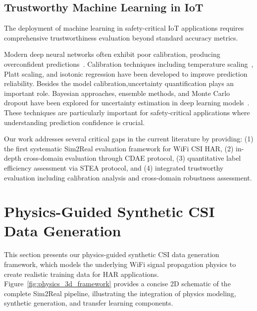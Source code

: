 \documentclass[journal]{IEEEtran}
\begin{document}
\subsection{Trustworthy Machine Learning in IoT}

The deployment of machine learning in safety-critical IoT applications requires comprehensive trustworthiness evaluation beyond standard accuracy metrics.

Modern deep neural networks often exhibit poor calibration, producing overconfident predictions~\cite{calibration_guo2017}. Calibration techniques including temperature scaling~\cite{temperature_scaling2017}, Platt scaling, and isotonic regression have been developed to improve prediction reliability.
Besides the model calibration,uncertainty quantification plays an important role.
Bayesian approaches, ensemble methods, and Monte Carlo dropout have been explored for uncertainty estimation in deep learning models~\cite{reliability_assessment2019}. These techniques are particularly important for safety-critical applications where understanding prediction confidence is crucial.

Our work addresses several critical gaps in the current literature by providing: (1) the first systematic Sim2Real evaluation framework for WiFi CSI HAR, (2) in-depth cross-domain evaluation through CDAE protocol, (3) quantitative label efficiency assessment via STEA protocol, and (4) integrated trustworthy evaluation including calibration analysis and cross-domain robustness assessment.

\section{Physics-Guided Synthetic CSI Data Generation}

This section presents our physics-guided synthetic CSI data generation framework, which models the underlying WiFi signal propagation physics to create realistic training data for HAR applications. Figure~\ref{fig:physics_3d_framework} provides a concise 2D schematic of the complete Sim2Real pipeline, illustrating the integration of physics modeling, synthetic generation, and transfer learning components.
\end{document}

